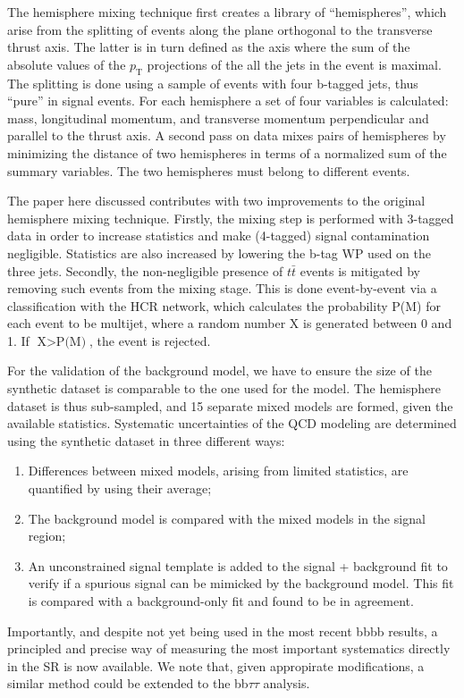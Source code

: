\documentclass[11pt]{article}
\newcommand{\pt}{p_{\text{T}}}
\newcommand{\bbbb}{bbbb}
\newcommand{\bbtt}{bb$\tau\tau$}
\newcommand{\ttbar}{t\bar{t}}
\begin{document}
\begin{enumerate}
The hemisphere mixing technique \cite{hemisphere_mixing} first creates a library of ``hemispheres'', which arise from the splitting of events along the plane orthogonal to the transverse thrust axis.
The latter is in turn defined as the axis where the sum of the absolute values of the \(\pt\) projections of the all the jets in the event is maximal.
The splitting is done using a sample of events with four b-tagged jets, thus ``pure'' in signal events.
For each hemisphere a set of four variables is calculated: mass, longitudinal momentum, and transverse momentum perpendicular and parallel to the thrust axis.
A second pass on data mixes pairs of hemispheres by minimizing the distance of two hemispheres in terms of a normalized sum of the summary variables.
The two hemispheres must belong to different events.

The paper here discussed \cite{zz_zh_bbbb} contributes with two improvements to the original hemisphere mixing technique.
Firstly, the mixing step is performed with 3-tagged data in order to increase statistics and make (4-tagged) signal contamination negligible.
Statistics are also increased by lowering the b-tag \ac{WP} used on the three jets.
Secondly, the non-negligible presence of \(\ttbar{}\) events is mitigated by removing such events from the mixing stage.
This is done event-by-event via a classification with the \ac{HCR} network, which calculates the probability P(M) for each event to be multijet, where a random number X is generated between 0 and 1. If \(\text{X} > \text{P(M)}\), the event is rejected.

For the validation of the background model, we have to ensure the size of the synthetic dataset is comparable to the one used for the model.
The hemisphere dataset is thus sub-sampled, and 15 separate mixed models are formed, given the available statistics.
Systematic uncertainties of the \ac{QCD} modeling are determined using the synthetic dataset in three different ways:
\begin{enumerate}
\item Differences between mixed models, arising from limited statistics, are quantified by using their average;
\item The background model is compared with the mixed models in the signal region;
\item An unconstrained signal template is added to the signal + background fit to verify if a spurious signal can be mimicked by the background model. This fit is compared with a background-only fit and found to be in agreement.
\end{enumerate}

Importantly, and despite not yet being used in the most recent \bbbb{} results, a principled and precise way of measuring the most important systematics directly in the \ac{SR} is now available.
We note that, given appropirate modifications, a similar method could be extended to the \bbtt{} analysis.
\end{enumerate}
\end{document}
